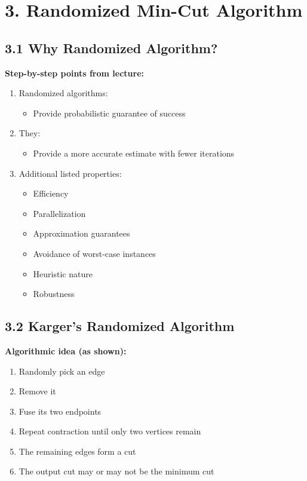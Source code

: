 \documentclass[11pt]{article}
\begin{document}
\section*{3. Randomized Min-Cut Algorithm}

\subsection*{3.1 Why Randomized Algorithm?}

\textbf{Step-by-step points from lecture:}
\begin{enumerate}
    \item Randomized algorithms:
    \begin{itemize}
        \item Provide probabilistic guarantee of success
    \end{itemize}
    \item They:
    \begin{itemize}
        \item Provide a more accurate estimate with fewer iterations
    \end{itemize}
    \item Additional listed properties:
    \begin{itemize}
        \item Efficiency
        \item Parallelization
        \item Approximation guarantees
        \item Avoidance of worst-case instances
        \item Heuristic nature
        \item Robustness
    \end{itemize}
\end{enumerate}

\subsection*{3.2 Karger’s Randomized Algorithm}

\textbf{Algorithmic idea (as shown):}
\begin{enumerate}
    \item Randomly pick an edge
    \item Remove it
    \item Fuse its two endpoints
    \item Repeat contraction until only two vertices remain
    \item The remaining edges form a cut
    \item The output cut may or may not be the minimum cut
\end{enumerate}
\end{document}
